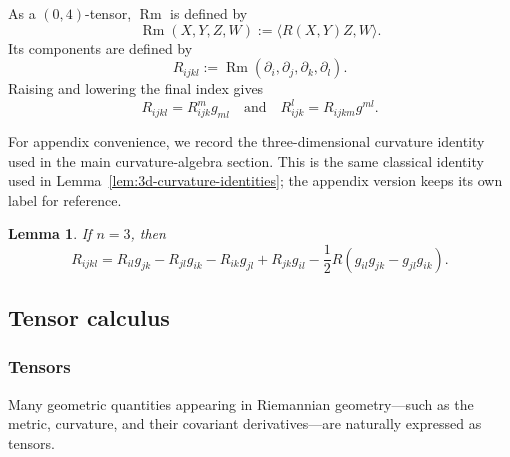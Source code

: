 \documentclass[11pt]{article}
\theoremstyle{plain}
\newtheorem{lemma}[theorem]{Lemma}
\theoremstyle{definition}
\theoremstyle{remark}
\newcommand{\vspacesub}{\vspace{0pt}}
\begin{document}
As a $(0,4)$-tensor, $\operatorname{Rm}$ is defined by
\begin{equation}
    \operatorname{Rm}(X,Y,Z,W) := \langle R(X,Y)Z,W \rangle . 
\end{equation}
Its components are defined by
\begin{equation}
    R_{ijkl} :=\operatorname{Rm}(\partial_i,\partial_j,\partial_k,\partial_l) .
\end{equation}
Raising and lowering the final index gives
\begin{equation}
    R_{ijkl}=R_{ijk}^m g_{ml} \quad \text{and} \quad R_{ijk}^l = R_{ijkm} g^{ml} . 
\end{equation}

For appendix convenience, we record the three-dimensional curvature identity
used in the main curvature-algebra section.  This is the same classical identity
used in Lemma~\ref{lem:3d-curvature-identities}; the appendix version keeps its
own label for reference.

\begin{lemma}\label{lem:3D Riem as Ricci and R}
    If $n=3$, then
\begin{equation}
    R_{ijkl} = R_{il}g_{jk} - R_{jl}g_{ik} 
    - R_{ik}g_{jl} + R_{jk}g_{il}
    - \frac{1}{2} R (g_{il}g_{jk} - g_{jl}g_{ik}) .
\end{equation}
\end{lemma}

\subsection{Tensor calculus}\label{subsec:TensorCalculus}

\subsubsection{Tensors}
\vspacesub 

Many geometric quantities appearing in Riemannian geometry---such as the metric,
curvature, and their covariant derivatives---are naturally expressed as tensors.
\end{document}
